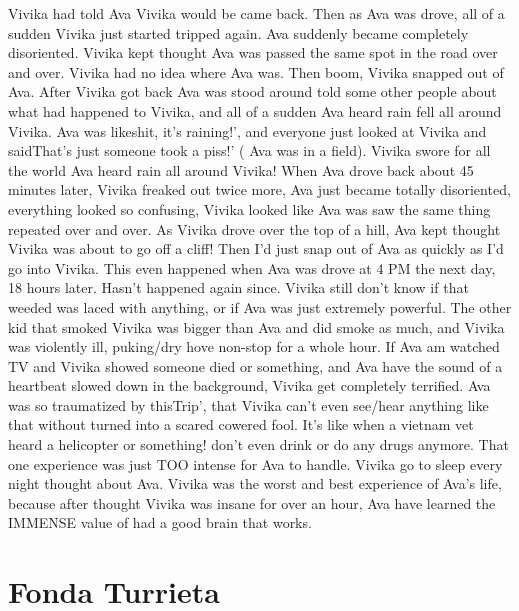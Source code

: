 \documentclass[12pt]{book}
\begin{document}
Vivika had told Ava Vivika would be came back. Then as Ava was drove, all of a sudden Vivika just started tripped again. Ava suddenly became completely disoriented. Vivika kept thought Ava was passed the same spot in the road over and over. Vivika had no idea where Ava was. Then boom, Vivika snapped out of Ava. After Vivika got back Ava was stood around told some other people about what had happened to Vivika, and all of a sudden Ava heard rain fell all around Vivika. Ava was likeshit, it's raining!', and everyone just looked at Vivika and saidThat's just someone took a piss!' ( Ava was in a field). Vivika swore for all the world Ava heard rain all around Vivika! When Ava drove back about 45 minutes later, Vivika freaked out twice more, Ava just became totally disoriented, everything looked so confusing, Vivika looked like Ava was saw the same thing repeated over and over. As Vivika drove over the top of a hill, Ava kept thought Vivika was about to go off a cliff! Then I'd just snap out of Ava as quickly as I'd go into Vivika. This even happened when Ava was drove at 4 PM the next day, 18 hours later. Hasn't happened again since. Vivika still don't know if that weeded was laced with anything, or if Ava was just extremely powerful. The other kid that smoked Vivika was bigger than Ava and did smoke as much, and Vivika was violently ill, puking/dry hove non-stop for a whole hour. If Ava am watched TV and Vivika showed someone died or something, and Ava have the sound of a heartbeat slowed down in the background, Vivika get completely terrified. Ava was so traumatized by thisTrip', that Vivika can't even see/hear anything like that without turned into a scared cowered fool. It's like when a vietnam vet heard a helicopter or something! don't even drink or do any drugs anymore. That one experience was just TOO intense for Ava to handle. Vivika go to sleep every night thought about Ava. Vivika was the worst and best experience of Ava's life, because after thought Vivika was insane for over an hour, Ava have learned the IMMENSE value of had a good brain that works.



\chapter{Fonda Turrieta}
\end{document}
